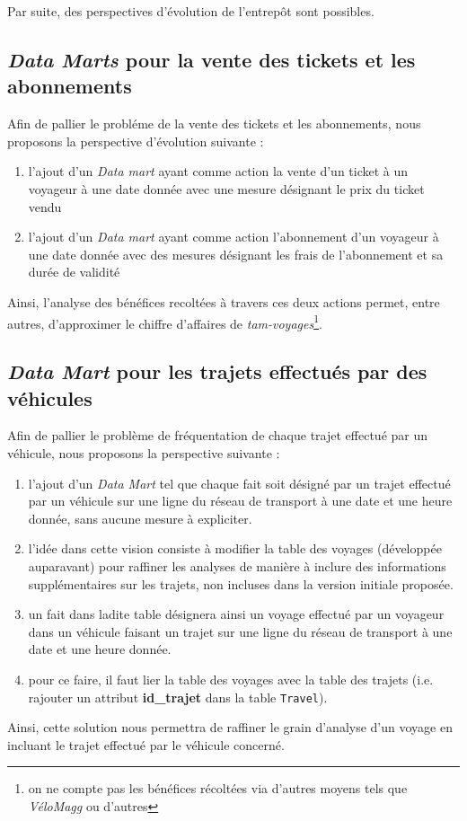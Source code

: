 \documentclass[a4paper,12pt]{report}
\begin{document}
Par suite, des perspectives d'évolution de l'entrepôt sont possibles.

\subsection{\textit{Data Marts} pour la vente des tickets et les abonnements}
Afin de pallier le probléme de la vente des tickets et les abonnements, nous proposons la perspective d'évolution suivante :
\begin{enumerate}
  \item l'ajout d'un \textit{Data mart} ayant comme action la vente d'un ticket à un voyageur à une date donnée avec une mesure désignant le prix du ticket vendu
  \item l'ajout d'un \textit{Data mart} ayant comme action l'abonnement d'un voyageur à une date donnée avec des mesures désignant les frais de l'abonnement et sa durée de validité
\end{enumerate}

Ainsi, l'analyse des bénéfices recoltées à travers ces deux actions permet, entre autres, d'approximer le chiffre d'affaires de \textit{tam-voyages}\footnote{on ne compte pas les bénéfices récoltées via d'autres moyens tels que \textit{VéloMagg} ou d'autres}.

\subsection{\textit{Data Mart} pour les trajets effectués par des véhicules}
Afin de pallier le problème de fréquentation de chaque trajet effectué par un véhicule, nous proposons la perspective suivante :
\begin{enumerate}
  \item l'ajout d'un \textit{Data Mart} tel que chaque fait soit désigné par un trajet effectué par un véhicule sur une ligne du réseau de transport à une date et une heure donnée, sans aucune mesure à expliciter.
  \item l'idée dans cette vision consiste à modifier la table des voyages (développée auparavant) pour raffiner les analyses de manière à inclure des informations supplémentaires sur les trajets, non incluses dans la version initiale proposée.
  \item un fait dans ladite table désignera ainsi un voyage effectué par un voyageur dans un véhicule faisant un trajet sur une ligne du réseau de transport à une date et une heure donnée.
  \item pour ce faire, il faut lier la table des voyages avec la table des trajets (i.e. rajouter un attribut \textbf{id\_trajet} dans la table \texttt{Travel}).
\end{enumerate}

Ainsi, cette solution nous permettra de raffiner le grain d'analyse d'un voyage en incluant le trajet effectué par le véhicule concerné.
\end{document}
